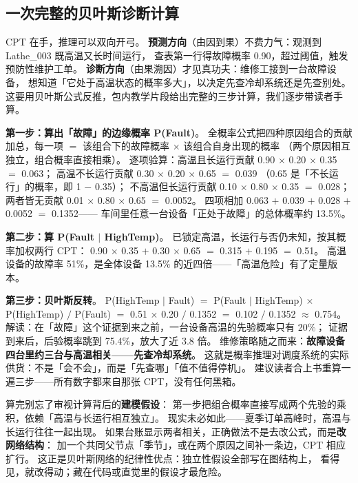 \subsection{一次完整的贝叶斯诊断计算}

CPT 在手，推理可以双向开弓。
\textbf{预测方向}（由因到果）不费力气：观测到 Lathe\_003 既高温又长时间运行，
查表第一行得故障概率 0.90，超过阈值，触发预防性维护工单。
\textbf{诊断方向}（由果溯因）才见真功夫：维修工接到一台故障设备，
想知道「它处于高温状态的概率多大」，以决定先查冷却系统还是先查别处。
这要用贝叶斯公式反推，包内教学片段给出完整的三步计算，我们逐步带读者手算。



\textbf{第一步：算出「故障」的边缘概率 P(Fault)}。
全概率公式把四种原因组合的贡献加总，每一项 \(=\)
该组合下的故障概率 \(\times\) 该组合自身出现的概率
（两个原因相互独立，组合概率直接相乘）。
逐项验算：高温且长运行贡献 0.90 \(\times\) 0.20 \(\times\) 0.35 \(=\) 0.063；
高温不长运行贡献 0.30 \(\times\) 0.20 \(\times\) 0.65 \(=\) 0.039
（0.65 是「不长运行」的概率，即 1 \(-\) 0.35）；
不高温但长运行贡献 0.10 \(\times\) 0.80 \(\times\) 0.35 \(=\) 0.028；
两者皆无贡献 0.01 \(\times\) 0.80 \(\times\) 0.65 \(=\) 0.0052。
四项相加 0.063 \(+\) 0.039 \(+\) 0.028 \(+\) 0.0052 \(=\) 0.1352——
车间里任意一台设备「正处于故障」的总体概率约 13.5\%。

\textbf{第二步：算 P(Fault \(\mid\) HighTemp)}。
已锁定高温，长运行与否仍未知，按其概率加权两行 CPT：
0.90 \(\times\) 0.35 \(+\) 0.30 \(\times\) 0.65 \(=\) 0.315 \(+\) 0.195 \(=\) 0.51。
高温设备的故障率 51\%，是全体设备 13.5\% 的近四倍——「高温危险」有了定量版本。

\textbf{第三步：贝叶斯反转}。
P(HighTemp \(\mid\) Fault) \(=\) P(Fault \(\mid\) HighTemp) \(\times\) P(HighTemp) \(/\) P(Fault)
\(=\) 0.51 \(\times\) 0.20 \(/\) 0.1352 \(=\) 0.102 \(/\) 0.1352 \(\approx\) 0.754。
解读：在「故障」这个证据到来之前，一台设备高温的先验概率只有 20\%；
证据到来后，后验概率跳到 75.4\%，放大了近 3.8 倍。
维修策略随之而来：\textbf{故障设备四台里约三台与高温相关——先查冷却系统}。
这就是概率推理对调度系统的实际供货：不是「会不会」，而是「先查哪」「值不值得停机」。
建议读者合上书重算一遍三步——所有数字都来自那张 CPT，没有任何黑箱。

算完别忘了审视计算背后的\textbf{建模假设}：
第一步把组合概率直接写成两个先验的乘积，依赖「高温与长运行相互独立」。
现实未必如此——夏季订单高峰时，高温与长运行往往一起出现。
如果台账显示两者相关，正确做法不是去改公式，而是\textbf{改网络结构}：
加一个共同父节点「季节」，或在两个原因之间补一条边，CPT 相应扩行。
这正是贝叶斯网络的纪律性优点：独立性假设全部写在图结构上，
看得见，就改得动；藏在代码或直觉里的假设才最危险。


